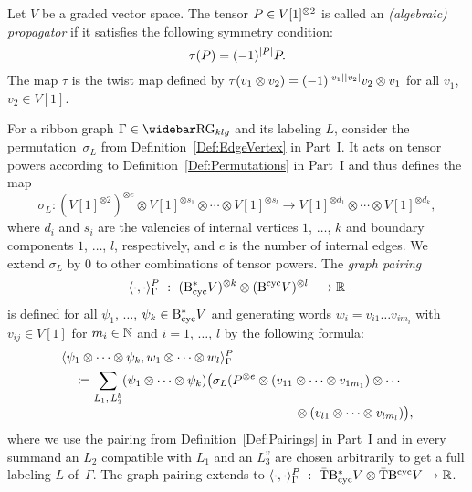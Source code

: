 \documentclass[\MainFolder/Text.tex]{subfiles}
\begin{document}
\begin{Def}\label{Def:EvalRibGraph}
Let $V$ be a graded vector space. The tensor $P\in V[1]^{\otimes 2}$ is called an \emph{(algebraic) propagator} if it satisfies the following symmetry condition:
\begin{equation}\label{Eq:SymmetryCondition}
 \tau(P) = (-1)^{|P|} P.
\end{equation}
The map $\tau$ is the twist map defined by $\tau(v_1 \otimes v_2) = (-1)^{|v_1||v_2|} v_2 \otimes v_1$ for all $v_1$, $v_2\in V[1]$.

For a ribbon graph $\Gamma \in \RRG_{klg}$ and its labeling $L$, consider the permutation~$\sigma_L$ from Definition~\ref{Def:EdgeVertex} in Part~I. It acts on tensor powers according to Definition~\ref{Def:Permutations} in Part~I and thus defines the map
\begin{equation*} \sigma_L: (V[1]^{\otimes 2})^{\otimes e} \otimes V[1]^{\otimes s_1} \otimes \dotsb \otimes V[1]^{\otimes s_l} \longrightarrow V[1]^{\otimes d_1} \otimes \dotsb \otimes V[1]^{\otimes d_k},
\end{equation*}
where $d_i$ and $s_i$ are the valencies of internal vertices $1$, $\dotsc$, $k$ and boundary components $1$, $\dotsc$, $l$, respectively, and $e$ is the number of internal edges. We extend $\sigma_L$ by $0$ to other combinations of tensor powers. The \emph{graph pairing}
$$ \langle \cdot, \cdot \rangle_{\Gamma}^P\ :\ (\DBCyc V)^{\otimes k} \otimes (\BCyc V)^{\otimes l} \longrightarrow \R  $$
is defined for all $\psi_1$, $\dotsc$, $\psi_{k} \in \mathrm{B}_{\mathrm{cyc}}^* V$ and generating words $w_i = v_{i1} \dots v_{i m_i}$ with $v_{ij} \in V[1]$ for $m_{i} \in \mathbb{N}$ and $i=1$, $\dotsc$, $l$ by the following formula:
\begin{align*}
&\langle \psi_1\otimes \dotsb \otimes \psi_{k}, w_1 \otimes \dotsb \otimes w_l \rangle_{\Gamma}^P \\
 &\quad \coloneqq \begin{multlined}[t]\smash{\sum_{L_1,\,L_3^b}}\vphantom{\sum_{L}} (\psi_1 \otimes \dotsb \otimes \psi_k)\bigl(\sigma_L(P^{\otimes e}\otimes  (v_{11}\otimes \dotsb \otimes v_{1 m_1}) \otimes \dotsb \\ \otimes (v_{l1}\otimes \dotsb \otimes v_{l m_{l}})\bigr), \end{multlined}
\end{align*}
where we use the pairing from Definition~\ref{Def:Pairings} in Part~I and in every summand an $L_2$ compatible with $L_1$ and an $L_{3}^v$ are chosen arbitrarily to get a full labeling $L$ of~$\Gamma$. The graph pairing extends to $\langle \cdot, \cdot\rangle_\Gamma^P\ :\ \bar{\mathrm{T}} \mathrm{B}_{\mathrm{cyc}}^* V \otimes \bar{\mathrm{T}} \mathrm{B}^{\mathrm{cyc}} V \rightarrow \mathbb{R}$. 
\end{Def}
\end{document}
